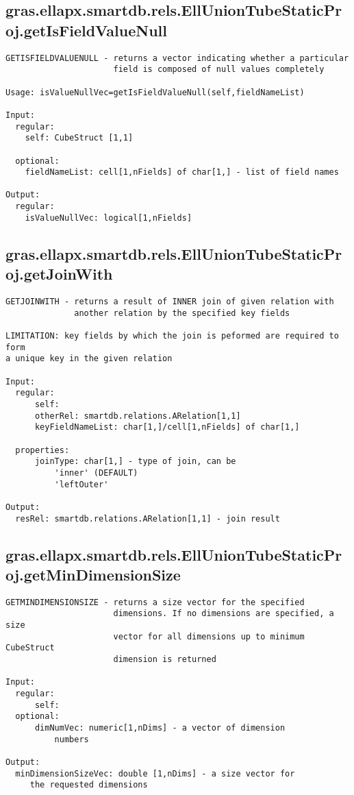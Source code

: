 \subsection{\texorpdfstring{gras.ellapx.smartdb.rels.EllUnionTubeStaticProj.getIsFieldValueNull}{getIsFieldValueNull}}\label{method:gras.ellapx.smartdb.rels.EllUnionTubeStaticProj.getIsFieldValueNull}
\begin{verbatim}
GETISFIELDVALUENULL - returns a vector indicating whether a particular
                      field is composed of null values completely

Usage: isValueNullVec=getIsFieldValueNull(self,fieldNameList)

Input:
  regular:
    self: CubeStruct [1,1]

  optional:
    fieldNameList: cell[1,nFields] of char[1,] - list of field names

Output:
  regular:
    isValueNullVec: logical[1,nFields]
\end{verbatim}
\subsection{\texorpdfstring{gras.ellapx.smartdb.rels.EllUnionTubeStaticProj.getJoinWith}{getJoinWith}}\label{method:gras.ellapx.smartdb.rels.EllUnionTubeStaticProj.getJoinWith}
\begin{verbatim}
GETJOINWITH - returns a result of INNER join of given relation with
              another relation by the specified key fields

LIMITATION: key fields by which the join is peformed are required to form
a unique key in the given relation

Input:
  regular:
      self:
      otherRel: smartdb.relations.ARelation[1,1]
      keyFieldNameList: char[1,]/cell[1,nFields] of char[1,]

  properties:
      joinType: char[1,] - type of join, can be
          'inner' (DEFAULT)
          'leftOuter'

Output:
  resRel: smartdb.relations.ARelation[1,1] - join result
\end{verbatim}
\subsection{\texorpdfstring{gras.ellapx.smartdb.rels.EllUnionTubeStaticProj.getMinDimensionSize}{getMinDimensionSize}}\label{method:gras.ellapx.smartdb.rels.EllUnionTubeStaticProj.getMinDimensionSize}
\begin{verbatim}
GETMINDIMENSIONSIZE - returns a size vector for the specified
                      dimensions. If no dimensions are specified, a size
                      vector for all dimensions up to minimum CubeStruct
                      dimension is returned

Input:
  regular:
      self:
  optional:
      dimNumVec: numeric[1,nDims] - a vector of dimension
          numbers

Output:
  minDimensionSizeVec: double [1,nDims] - a size vector for
     the requested dimensions
\end{verbatim}
